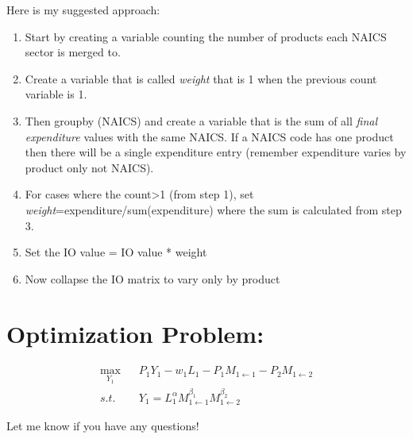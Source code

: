 \documentclass[12pt,english]{article}
\begin{document}
Here is my suggested approach:

\begin{enumerate}
	\item Start by creating a variable counting the number of products each NAICS sector is merged to.
	\item Create a variable that is called \emph{weight} that is 1 when the previous count variable is 1.
	\item Then groupby (NAICS) and create a variable that is the sum of all \emph{final expenditure} values with the same NAICS. If a NAICS code has one product then there will be a single expenditure entry (remember expenditure varies by product only not NAICS). 
	\item For cases where the count>1 (from step 1), set \emph{weight}=expenditure/sum(expenditure) where the sum is calculated from step 3.
	\item Set the IO value = IO value * weight 
	\item Now collapse the IO matrix to vary only by product
\end{enumerate}

\section*{Optimization Problem:}

\begin{align*}
	\max_{Y_1}&\;\;\; P_1Y_1 - w_1L_1 - P_1 M_{1\leftarrow 1}- P_2 M_{1\leftarrow 2}\\
		s.t.&\;\;\; Y_1=L_1^{\alpha}M_{1\leftarrow 1}^{\beta_1}M_{1\leftarrow 2}^{\beta_2}
\end{align*}

Let me know if you have any questions!
\end{document}
